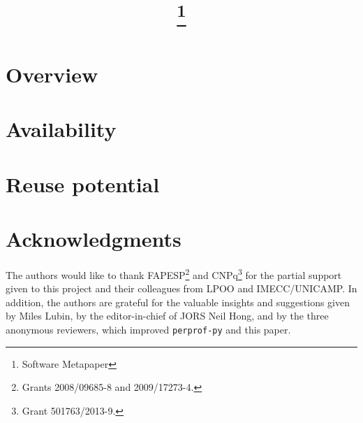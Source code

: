 \documentclass{article}
\begin{document}
\title{\mytitle\thanks{Software Metapaper}}
\author{\myauthor}
\date{\small \myaffiliation}
\maketitle
    \begin{abstract}
      
    \end{abstract}



\section{Overview}


\section{Availability}


\section{Reuse potential}

   

\section*{{Acknowledgments}}
The authors would like to thank FAPESP\footnote{Grants 2008/09685-8 and 2009/17273-4.}
and CNPq\footnote{Grant 501763/2013-9.} for the
partial support given to this project
and their colleagues from LPOO and IMECC/UNICAMP.
In addition, the authors are grateful for the valuable insights and suggestions 
given by Miles Lubin, by the editor-in-chief of JORS Neil Hong, and by the three anonymous reviewers, which improved
{\tt perprof-py} and this paper.

\printbibliography
\end{document}
